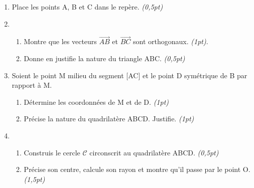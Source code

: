 \documentclass[12pt,a4paper]{book}
\begin{document}
\begin{enumerate}
\item Place les points A, B et C dans le repère. \emph{(0,5pt)}
\item \begin{enumerate}
\item Montre que les vecteurs $\overrightarrow{AB}$ et $\overrightarrow{BC}$ sont orthogonaux. \emph{(1pt)}.
\item Donne en justifie la nature du triangle ABC. \emph{(0,5pt)}
\end{enumerate}
\item Soient le point M milieu du segment [AC] et le point D symétrique de B par rapport à M.
\begin{enumerate}
\item Détermine les coordonnées de M et de D. \emph{(1pt)}
\item Précise la nature du quadrilatère ABCD. Justifie. \emph{(1pt)}
\end{enumerate} 
\item \begin{enumerate}
\item Construis le cercle $\mathcal{C}$ circonscrit au quadrilatère ABCD. \emph{(0,5pt)}
\item Précise son centre, calcule son rayon et montre qu'il passe par le point O. \emph{(1,5pt)}
\end{enumerate}
\end{enumerate}

\newpage
\end{document}
